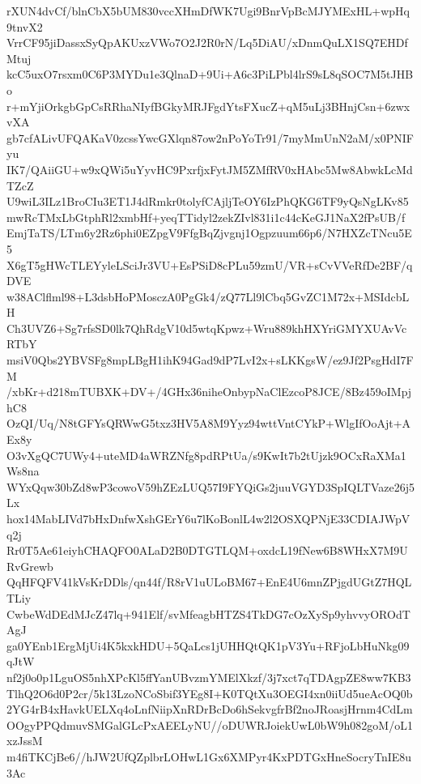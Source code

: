 rXUN4dvCf/blnCbX5bUM830vccXHmDfWK7Ugi9BnrVpBcMJYMExHL+wpHq9tnvX2
VrrCF95jiDassxSyQpAKUxzVWo7O2J2R0rN/Lq5DiAU/xDnmQuLX1SQ7EHDfMtuj
kcC5uxO7rsxm0C6P3MYDu1e3QlnaD+9Ui+A6c3PiLPbl4lrS9sL8qSOC7M5tJHBo
r+mYjiOrkgbGpCsRRhaNIyfBGkyMRJFgdYtsFXucZ+qM5uLj3BHnjCsn+6zwxvXA
gb7cfALivUFQAKaV0zcssYwcGXlqn87ow2nPoYoTr91/7myMmUnN2aM/x0PNIFyu
IK7/QAiiGU+w9xQWi5uYyvHC9PxrfjxFytJM5ZMfRV0xHAbc5Mw8AbwkLcMdTZcZ
U9wiL3ILz1BroCIu3ET1J4dRmkr0tolyfCAjljTeOY6IzPhQKG6TF9yQsNgLKv85
mwRcTMxLbGtphRl2xmbHf+yeqTTidyl2zekZIvl831i1c44cKeGJ1NaX2fPsUB/f
EmjTaTS/LTm6y2Rz6phi0EZpgV9FfgBqZjvgnj1Ogpzuum66p6/N7HXZcTNcu5E5
X6gT5gHWcTLEYyleLSciJr3VU+EsPSiD8cPLu59zmU/VR+sCvVVeRfDe2BF/qDVE
w38AClflml98+L3dsbHoPMosczA0PgGk4/zQ77Ll9lCbq5GvZC1M72x+MSIdcbLH
Ch3UVZ6+Sg7rfsSD0lk7QhRdgV10d5wtqKpwz+Wru889khHXYriGMYXUAvVcRTbY
msiV0Qbs2YBVSFg8mpLBgH1ihK94Gad9dP7LvI2x+sLKKgsW/ez9Jf2PsgHdI7FM
/xbKr+d218mTUBXK+DV+/4GHx36niheOnbypNaClEzcoP8JCE/8Bz459oIMpjhC8
OzQI/Uq/N8tGFYsQRWwG5txz3HV5A8M9Yyz94wttVntCYkP+WlgIfOoAjt+AEx8y
O3vXgQC7UWy4+uteMD4aWRZNfg8pdRPtUa/s9KwIt7b2tUjzk9OCxRaXMa1Ws8na
WYxQqw30bZd8wP3cowoV59hZEzLUQ57I9FYQiGs2juuVGYD3SpIQLTVaze26j5Lx
hox14MabLIVd7bHxDnfwXshGErY6u7lKoBonlL4w2l2OSXQPNjE33CDIAJWpVq2j
Rr0T5Ae61eiyhCHAQFO0ALaD2B0DTGTLQM+oxdcL19fNew6B8WHxX7M9URvGrewb
QqHFQFV41kVsKrDDls/qn44f/R8rV1uULoBM67+EnE4U6mnZPjgdUGtZ7HQLTLiy
CwbeWdDEdMJcZ47lq+941Elf/svMfeagbHTZS4TkDG7cOzXySp9yhvvyOROdTAgJ
ga0YEnb1ErgMjUi4K5kxkHDU+5QaLcs1jUHHQtQK1pV3Yu+RFjoLbHuNkg09qJtW
nf2j0o0p1LguOS5nhXPcKl5ffYanUBvzmYMElXkzf/3j7xct7qTDAgpZE8ww7KB3
TlhQ2O6d0P2cr/5k13LzoNCoSbif3YEg8I+K0TQtXu3OEGI4xn0iiUd5ueAcOQ0b
2YG4rB4xHavkUELXq4oLnfNiipXnRDrBcDo6hSekvgfrBf2noJRoasjHrnm4CdLm
OOgyPPQdmuvSMGalGLcPxAEELyNU//oDUWRJoiekUwL0bW9h082goM/oL1xzJssM
m4fiTKCjBe6//hJW2UfQZplbrLOHwL1Gx6XMPyr4KxPDTGxHneSocryTnIE8u3Ac
